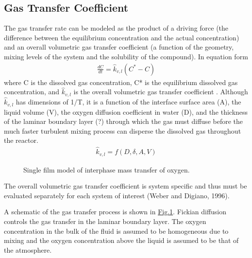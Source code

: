 \documentclass[letterpaper,10pt,english]{sphinxmanual}
\let\sphinxpxdimen\pdfpxdimen\else\newdimen\sphinxpxdimen
\begin{document}
\subsection{Gas Transfer Coefficient}
\label{\detokenize{Gas_Transfer/Gas_Transfer:gas-transfer-coefficient}}\label{\detokenize{Gas_Transfer/Gas_Transfer:heading-gas-transfer-coefficient}}
The gas transfer rate can be modeled as the product of a driving force (the difference between the equilibrium concentration and the actual concentration) and an overall volumetric gas transfer coefficient (a function of the geometry, mixing levels of the system and the solubility of the compound). In equation form
\begin{equation}\label{equation:Gas_Transfer/Gas_Transfer:eq_Gas_first_order}
\begin{split} \frac{dC}{dt} =\hat{k}_{v,l} \left(C^{*} -C\right)\end{split}
\end{equation}
where C is the dissolved gas concentration, C* is the equilibrium dissolved gas concentration, and \(\hat{k}_{v,l}\) is the overall volumetric gas transfer coefficient . Although \(\hat{k}_{v,l}\) has dimensions of 1/T, it is a function of the interface surface area (A), the liquid volume (V), the oxygen diffusion coefficient in water (D), and the thickness of the laminar boundary layer (?) through which the gas must diffuse before the much faster turbulent mixing process can disperse the dissolved gas throughout the reactor.
\begin{equation}\label{equation:Gas_Transfer/Gas_Transfer:Gas_Transfer/Gas_Transfer:0}
\begin{split}\hat{k}_{v,l} =f(D,\delta ,A,V)\end{split}
\end{equation}
\begin{figure}[htbp]
\centering
\capstart

\noindent\sphinxincludegraphics[width=300\sphinxpxdimen]{{Single_film_model}.png}
\caption{Single film model of interphase mass transfer of oxygen.}\label{\detokenize{Gas_Transfer/Gas_Transfer:id3}}\label{\detokenize{Gas_Transfer/Gas_Transfer:figure-single-film-model}}\end{figure}

The overall volumetric gas transfer coefficient is system specific and thus must be evaluated separately for each system of interest (Weber and Digiano, 1996).

A schematic of the gas transfer process is shown in \hyperref[\detokenize{Gas_Transfer/Gas_Transfer:figure-single-film-model}]{Fig.\@ \ref{\detokenize{Gas_Transfer/Gas_Transfer:figure-single-film-model}}}. Fickian diffusion controls the gas transfer in the laminar boundary layer. The oxygen concentration in the bulk of the fluid is assumed to be homogeneous due to mixing and the oxygen concentration above the liquid is assumed to be that of the atmosphere.
\end{document}
